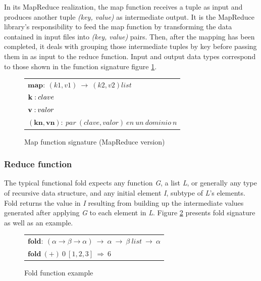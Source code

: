 In its MapReduce realization, the map function receives a tuple as input and produces another tuple \emph{(key, value)} as intermediate output. It is the MapReduce library's responsibility to feed the map function by transforming the data contained in input files into \emph{(key, value)} pairs. Then, after the mapping has been completed, it deals with grouping those intermediate tuples by key before passing them in as input to the reduce function. Input and output data types correspond to those shown in the function signature figure \ref{fig:mapreducemap}.

\begin{figure}[tbp]
\begin{center}
\begin{tabular}{|l|}
\hline
$\mathbf{map:} \: \left( k1,v1 \right) \: \rightarrow \: \left( k2,v2 \right) list$ \\
$\mathbf{k:} \: clave \linebreak$ \\
$\mathbf{v:} \: valor \linebreak$ \\
$\mathbf{\left(kn,vn \right):} \: par \: \left( clave,valor \right) \: en \: un \: dominio \: n$ \\
\hline
\end{tabular}
\caption{Map function signature (MapReduce version)}
\label{fig:mapreducemap}
\end{center}
\end{figure}


\subsubsection{Reduce function}\label{reduce}
\noindent The typical functional fold expects any function \emph{G}, a list \emph{L}, or generally any type of recursive data structure, and any initial element \emph{I}, subtype of \emph{L}'s elements. Fold returns the value in \emph{I} resulting from building up the intermediate values generated after applying \emph{G} to each element in \emph{L}. Figure \ref{fig:fold} presents fold signature as well as an example.

\begin{figure}[tbp]
\begin{center}
\begin{tabular}{|l|}
\hline
$\mathbf{fold:} \: \left( \alpha \rightarrow \beta \rightarrow \alpha \right) \: \rightarrow \: \alpha \: \rightarrow \: \beta \: list \: \rightarrow \: \alpha$ \\
$\mathbf{fold} \: \left( \mathbf{+} \right) \: 0 \: \left[ 1,2,3 \right] \: \Rightarrow \: 6$ \\
\hline
\end{tabular}
\caption{Fold function example}
\label{fig:fold}
\end{center}
\end{figure}

